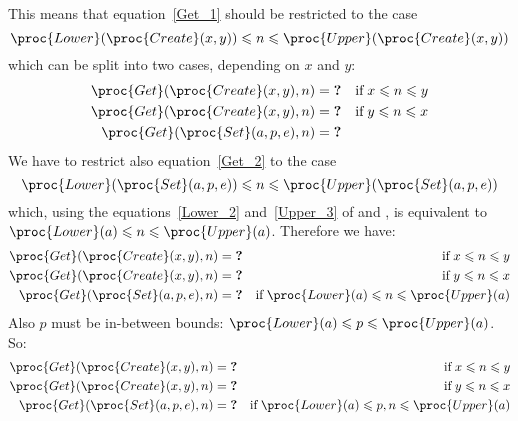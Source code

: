 \begin{itemize}
  This means that equation~\ref{Get_1} should be restricted to the
  case
  \[
    \proc{Lower} (\proc{Create} (x, y)) \leqslant n 
    \leqslant \proc{Upper} (\proc{Create} (x, y))
  \]
  which can be split into two cases, depending on \(x\) and \(y\):
  \begin{align*}
     \proc{Get} (\proc{Create} (x, y), n) 
  &= \textbf{?}
  & \text{if} \; x \leqslant n \leqslant y\\
     \proc{Get} (\proc{Create} (x, y), n) 
  &= \textbf{?} 
  & \text{if} \; y \leqslant n \leqslant x\\
     \proc{Get} (\proc{Set} (a, p, e), n)
  &= \textbf{?}
  \end{align*}
  We have to restrict also equation~\ref{Get_2} to the case
  \[
    \proc{Lower} (\proc{Set} (a, p, e)) \leqslant n 
    \leqslant \proc{Upper} (\proc{Set} (a, p, e))
  \]
  which, using the equations~\ref{Lower_2} and~\ref{Upper_3} of
   and , is equivalent to
  \(
    \proc{Lower} (a) \leqslant n \leqslant \proc{Upper} (a)
  \).
  Therefore we have:
  \begin{align*}
     \proc{Get} (\proc{Create} (x, y), n) 
  &= \textbf{?}
  & \text{if} \; x \leqslant n \leqslant y\\
     \proc{Get} (\proc{Create} (x, y), n) 
  &= \textbf{?} 
  & \text{if} \; y \leqslant n \leqslant x\\
     \proc{Get} (\proc{Set} (a, p, e), n)
  &= \textbf{?}
  & \text{if} \;\proc{Lower} (a) \leqslant n \leqslant \proc{Upper} (a)
  \end{align*}
  Also \(p\) must be in-between bounds:
  \(\proc{Lower} (a) \leqslant p \leqslant \proc{Upper} (a)\).
  So:
  \begin{align*}
     \proc{Get} (\proc{Create} (x, y), n) 
  &= \textbf{?}
  & \text{if} \; x \leqslant n \leqslant y\\
     \proc{Get} (\proc{Create} (x, y), n) 
  &= \textbf{?} 
  & \text{if} \; y \leqslant n \leqslant x\\
     \proc{Get} (\proc{Set} (a, p, e), n)
  &= \textbf{?}
  & \text{if} \;\proc{Lower} (a) \leqslant p, n \leqslant \proc{Upper} (a)
  \end{align*}


\end{itemize}
